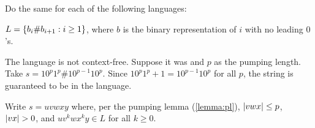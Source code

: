 \begin{problem}
  Do the same for each of the following languages:
  \begin{enumalph}
    \item $L = \left\{b_i \# b_{i+1} : i \geq 1\right\}$, where $b$ is the binary
      representation of $i$ with no leading $0$'s.
      \begin{Answer}
        The language is not context-free. Suppose it was and $p$ as the pumping length.
        Take $s = 10^p1^p\#10^{p-1}10^p$. Since $10^p1^p + 1 = 10^{p-1}10^p$
        for all $p$, the string is guaranteed to be in the language.

        Write $s = uvwxy$ where, per the pumping lemma (\ref{lemma:pl}),
        $\lvert vwx\rvert \leq p$, $\lvert vx\rvert > 0$, and $uv^kwx^ky \in L$ for all $k \geq 0$.


\end{Answer}
\end{enumalph}
\end{problem}
